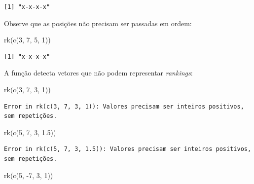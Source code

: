 \documentclass[
  letterpaper,
  DIV=11,
  numbers=noendperiod]{scrreprt}
\newenvironment{Shaded}{\begin{snugshade}}{\end{snugshade}}
\newcommand{\DecValTok}[1]{\textcolor[rgb]{0.68,0.00,0.00}{#1}}
\newcommand{\FloatTok}[1]{\textcolor[rgb]{0.68,0.00,0.00}{#1}}
\newcommand{\FunctionTok}[1]{\textcolor[rgb]{0.28,0.35,0.67}{#1}}
\newcommand{\NormalTok}[1]{\textcolor[rgb]{0.00,0.23,0.31}{#1}}
\newcommand{\SpecialCharTok}[1]{\textcolor[rgb]{0.37,0.37,0.37}{#1}}
\begin{document}
\begin{verbatim}
[1] "x-x-x-x"
\end{verbatim}

Observe que as posições não precisam ser passadas em ordem:

\begin{Shaded}
\begin{Highlighting}[]
\FunctionTok{rk}\NormalTok{(}\FunctionTok{c}\NormalTok{(}\DecValTok{3}\NormalTok{, }\DecValTok{7}\NormalTok{, }\DecValTok{5}\NormalTok{, }\DecValTok{1}\NormalTok{))}
\end{Highlighting}
\end{Shaded}

\begin{verbatim}
[1] "x-x-x-x"
\end{verbatim}

A função detecta vetores que não podem representar \emph{rankings}:

\begin{Shaded}
\begin{Highlighting}[]
\FunctionTok{rk}\NormalTok{(}\FunctionTok{c}\NormalTok{(}\DecValTok{3}\NormalTok{, }\DecValTok{7}\NormalTok{, }\DecValTok{3}\NormalTok{, }\DecValTok{1}\NormalTok{))}
\end{Highlighting}
\end{Shaded}

\begin{verbatim}
Error in rk(c(3, 7, 3, 1)): Valores precisam ser inteiros positivos, sem repetições.
\end{verbatim}

\begin{Shaded}
\begin{Highlighting}[]
\FunctionTok{rk}\NormalTok{(}\FunctionTok{c}\NormalTok{(}\DecValTok{5}\NormalTok{, }\DecValTok{7}\NormalTok{, }\DecValTok{3}\NormalTok{, }\FloatTok{1.5}\NormalTok{))}
\end{Highlighting}
\end{Shaded}

\begin{verbatim}
Error in rk(c(5, 7, 3, 1.5)): Valores precisam ser inteiros positivos, sem repetições.
\end{verbatim}

\begin{Shaded}
\begin{Highlighting}[]
\FunctionTok{rk}\NormalTok{(}\FunctionTok{c}\NormalTok{(}\DecValTok{5}\NormalTok{, }\SpecialCharTok{{-}}\DecValTok{7}\NormalTok{, }\DecValTok{3}\NormalTok{, }\DecValTok{1}\NormalTok{))}
\end{Highlighting}
\end{Shaded}
\end{document}
